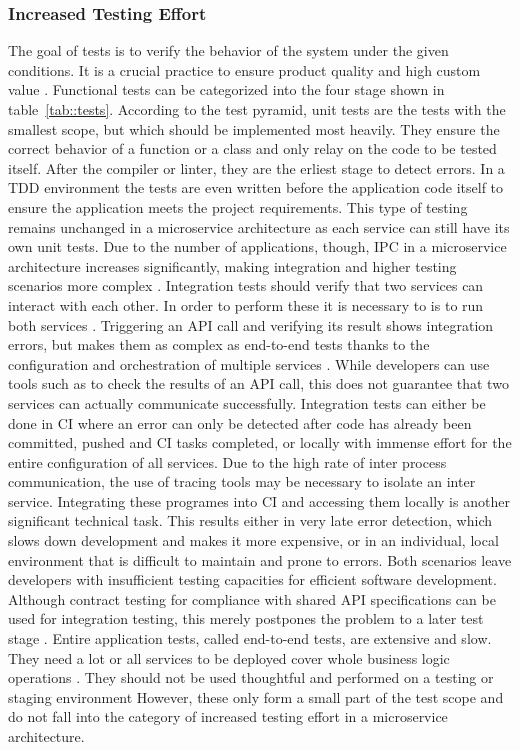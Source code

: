 \documentclass[12pt, a4paper]{article}
\begin{document}
        \subsubsection{Increased Testing Effort}\label{sss::testing_problem}
        The goal of tests is to verify the behavior of the system under the given conditions. It is a crucial practice to ensure product quality and high custom value \cite{azuredevops}. Functional tests can be categorized into the four stage shown in table~\ref{tab::tests}. According to the test pyramid, unit tests are the tests with the smallest scope, but which should be implemented most heavily. They ensure the correct behavior of a function or a class and only relay on the code to be tested itself. After the compiler or linter, they are the erliest stage to detect errors. In a \ac{TDD} environment the tests are even written before the application code itself to ensure the application meets the project requirements. This type of testing remains unchanged in a microservice architecture as each service can still have its own unit tests. Due to the number of applications, though, \ac{IPC} in a microservice architecture increases significantly, making integration and higher testing scenarios more complex \cite{microtest}. \newline
        Integration tests should verify that two services can interact with each other. In order to perform these it is necessary to is to run both services \cite{azuredevops}. Triggering an \ac{API} call and verifying its result shows integration errors, but makes them as complex as end-to-end tests thanks to the configuration and orchestration of multiple services \cite{microtest}. While developers can use tools such as  to check the results of an \ac{API} call, this does not guarantee that two services can actually communicate successfully. Integration tests can either be done in \ac{CI} where an error can only be detected after code has already been committed, pushed and \ac{CI} tasks completed, or locally with immense effort for the entire configuration of all services. Due to the high rate of inter process communication, the use of tracing tools may be necessary to isolate an inter service. Integrating these programes into \ac{CI} and accessing them locally is another significant technical task. This results either in very late error detection, which slows down development and makes it more expensive, or in an individual, local environment that is difficult to maintain and prone to errors. Both scenarios leave developers with insufficient testing capacities for efficient software development. Although contract testing for compliance with shared \ac{API} specifications can be used for integration testing, this merely postpones the problem to a later test stage \cite{microtest}. \newline
        Entire application tests, called end-to-end tests, are extensive and slow. They need a lot or all services to be deployed cover whole business logic operations \cite{microtest}. They should not be used thoughtful and performed on a testing or staging environment However, these only form a small part of the test scope and do not fall into the category of increased testing effort in a microservice architecture.
\end{document}
